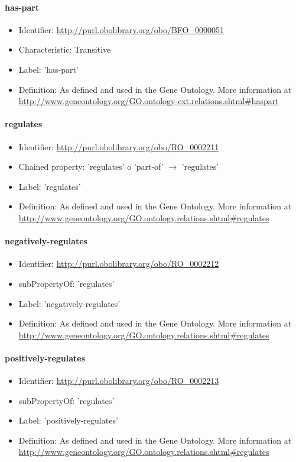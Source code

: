 \paragraph{has-part}
\begin{itemize}
  \item Identifier: \url{http://purl.obolibrary.org/obo/BFO\_0000051}
  \item Characteristic: Transitive
  \item Label: 'has-part'
  \item Definition: As defined and used in the Gene Ontology. More information at \url{http://www.geneontology.org/GO.ontology-ext.relations.shtml\#haspart}
\end{itemize}

\paragraph{regulates}
\begin{itemize}
  \item Identifier: \url{http://purl.obolibrary.org/obo/RO\_0002211}
  \item Chained property: 'regulates' o 'part-of' $ \rightarrow $ 'regulates'
  \item Label: 'regulates'
  \item Definition: As defined and used in the Gene Ontology. More information at \url{http://www.geneontology.org/GO.ontology.relations.shtml\#regulates}
\end{itemize}

\paragraph{negatively-regulates}
\begin{itemize}
  \item Identifier: \url{http://purl.obolibrary.org/obo/RO\_0002212}
  \item subPropertyOf: 'regulates'
  \item Label: 'negatively-regulates'
  \item Definition: As defined and used in the Gene Ontology. More information at \url{http://www.geneontology.org/GO.ontology.relations.shtml\#regulates}
\end{itemize}

\paragraph{positively-regulates}
\begin{itemize}
  \item Identifier: \url{http://purl.obolibrary.org/obo/RO\_0002213}
  \item subPropertyOf: 'regulates'
  \item Label: 'positively-regulates'
  \item Definition: As defined and used in the Gene Ontology. More information at \url{http://www.geneontology.org/GO.ontology.relations.shtml\#regulates}
\end{itemize}

